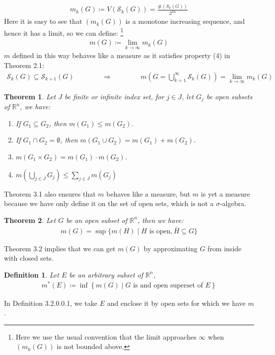 \documentclass[11pt]{book}
\theoremstyle{break}
\theoremstyle{break}
\newtheorem{thm}{Theorem}[section]
\newtheorem{defn}{Definition}[corL]
\newcommand{\R}{\mathbb{R}}
\begin{document}
\begin{align*}
m_k(G) \coloneqq  V(\mathcal{S}_k(G)) = \frac{\#(S_k(G))}{2^{kn}}
\end{align*}
Here it is easy to see that $(m_k(G))$ is a monotone increasing sequence, and hence it has a limit, so we can define: \footnote{Here we use the usual convention that the limit approaches $\infty$ when $(m_k(G))$ is not bounded above.}
\begin{align*}
m(G) \coloneqq \lim_{k\to \infty} m_k(G)
\end{align*}
$m$ defined in this way behaves like a measure as it satisfies property (4) in Theorem 2.1:
\begin{align*}
\mathcal{S}_k (G) \subseteq \mathcal{S}_{k+1} (G) \qquad \qquad\Rightarrow\qquad \qquad m\left(G = \bigcup_{k=1}^\infty \mathcal{S}_k(G)\right) = \lim_{k\to \infty }m_k(G)
\end{align*}

\begin{thm}
Let $J$ be finite or infinite index set, for $j \in J$, let $G_j$ be open subsets of $\R^n$, we have:
\begin{enumerate}[topsep=3pt,itemsep=-1ex,partopsep=1ex,parsep=1ex]
\item If $G_1\subseteq G_2$, then $m(G_1) \leq m(G_2)$.
\item If $G_1\cap G_2 = \emptyset$, then $m(G_1\cup G_2) = m(G_1)+m(G_2)$.
\item $m(G_1\times G_2) = m(G_1) \cdot m(G_2)$.
\item $m(\bigcup_{j\in J} G_j) \leq \sum_{j\in J} m(G_j)$
\end{enumerate}
\end{thm}

Theorem 3.1 also ensures that $m$ behaves like a measure, but $m$ is yet a measure because we have only define it on the set of open sets, which is not a $\sigma$-algebra. \\

\begin{thm}
Let $G$ be an open subset of $\R^n$, then we have:
\begin{align*}
m(G) = \sup \{ m(H) \mid H\text{ is open}, \bar{H} \subseteq G\}
\end{align*}
\end{thm}
Theorem 3.2 implies that we can get $m(G)$ by approximating $G$ from inside with closed sets. 

\hfill\break
\begin{defn}
Let $E$ be an arbitrary subset of $\R^n$, 
\begin{align*}
m^*(E) \coloneqq \inf \left\{ m(G) \mid G \text{ is and open superset of }E \right\}
\end{align*}
\end{defn}
In Definition 3.2.0.0.1, we take $E$ and enclose it by open sets for which we have $m$. 
\end{document}
